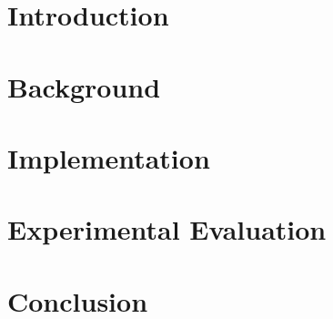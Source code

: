 \documentclass{article}
\begin{document}
\begin{abstract}
    
\end{abstract}
\section*{Introduction}

\section*{Background}


\section*{Implementation}

\section*{Experimental Evaluation}

\section*{Conclusion}

\end{document}
